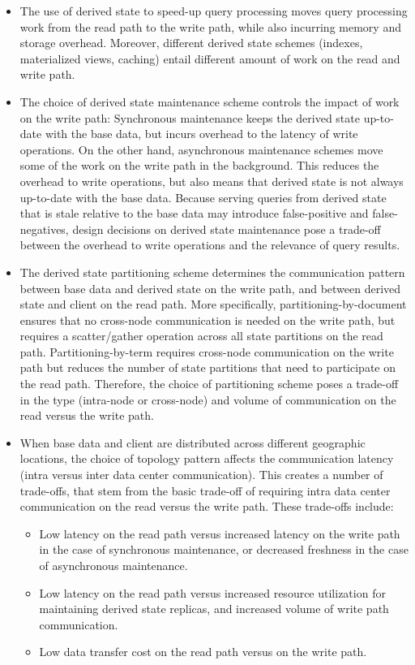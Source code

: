 \begin{itemize}
  \item The use of derived state to speed-up query processing moves query processing work from the read path to the write
  path, while also incurring memory and storage overhead.
  Moreover, different derived state schemes (indexes, materialized views, caching) entail different amount of work
  on the read and write path.

  \item The choice of derived state maintenance scheme controls the impact of work on the write path:
  Synchronous maintenance keeps the derived state up-to-date with the base data,
  but incurs overhead to the latency of write operations.
  On the other hand, asynchronous maintenance schemes move some of the work on the write path in the background.
  This reduces the overhead to write operations, but also means that derived state is not always up-to-date with the base
  data.
  Because serving queries from derived state that is stale relative to the base data may introduce false-positive and
  false-negatives,
  design decisions on derived state maintenance pose a trade-off between the overhead to write operations
  and the relevance of query results.

  \item The derived state partitioning scheme determines the communication pattern between base data and derived state
  on the write path, and between derived state and client on the read path.
  More specifically, partitioning-by-document ensures that no cross-node communication is needed on the write path,
  but requires a scatter/gather operation across all state partitions on the read path.
  Partitioning-by-term requires cross-node communication on the write path but reduces the number of state partitions
  that need to participate on the read path.
  Therefore, the choice of partitioning scheme poses a trade-off in the type (intra-node or cross-node) and volume
  of communication on the read versus the write path.

  \item When base data and client are distributed across different geographic locations,
  the choice of topology pattern affects the communication latency (intra versus inter data center communication).
  This creates a number of trade-offs, that stem from the basic trade-off of requiring intra data center communication
  on the read versus the write path.
  These trade-offs include:
  \begin{itemize}
    \item Low latency on the read path versus increased latency on the write path in the case of synchronous maintenance,
    or decreased freshness in the case of asynchronous maintenance.
    \item Low latency on the read path versus increased resource utilization for maintaining derived state replicas,
    and increased volume of write path communication.
    \item Low data transfer cost on the read path versus on the write path.
  \end{itemize}

\end{itemize}






